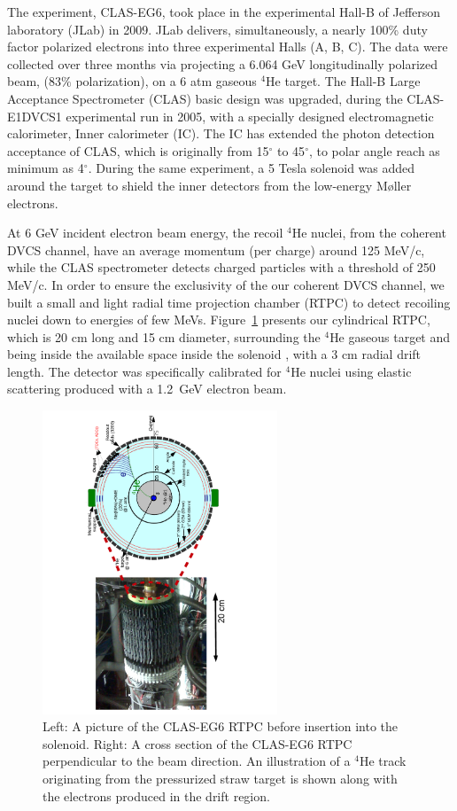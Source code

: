 \documentclass[nofootinbib,twocolumn,showpacs,prl,superscriptaddress,secnumarabic,amssymb,nobibnotes,aps,floatfix]{revtex4}
\begin{document}

The experiment, CLAS-EG6, took place in the experimental Hall-B of Jefferson 
laboratory (JLab) in 2009. JLab delivers, simultaneously, a nearly 100\% duty 
factor polarized electrons into three experimental Halls (A, B, C). The data 
were collected over three months via projecting a 6.064 GeV longitudinally 
polarized beam, (83$\%$ polarization), on a 6 atm gaseous $^4$He target.  The 
Hall-B Large Acceptance Spectrometer (CLAS) basic design \cite{CLAS_ref} was 
upgraded, during the CLAS-E1DVCS1 experimental run \cite{Girod:2007aa} in 2005, 
with a specially designed electromagnetic calorimeter, Inner calorimeter (IC).  
The IC has extended the photon detection acceptance of CLAS, which is 
originally from 15$^{\circ}$ to 45$^{\circ}$, to polar angle reach as minimum 
as 4$^{\circ}$. During the same experiment, a 5 Tesla solenoid was added around 
the target to shield the inner detectors from the low-energy M\o ller 
electrons.

At 6 GeV incident electron beam energy, the recoil $^4$He nuclei, from the 
coherent DVCS channel, have an average momentum (per charge) around 125 MeV/c, 
while the CLAS spectrometer detects charged particles with a threshold of 250 
MeV/c. In order to ensure the exclusivity of the our coherent DVCS channel, we 
built a small and light radial time projection chamber (RTPC) to detect 
recoiling nuclei down to energies of few MeVs. Figure~\ref{fig:RTPC} presents 
our cylindrical RTPC, which is 20 cm long and 15 cm diameter, surrounding the 
$^4$He gaseous target and being inside the available space inside the solenoid 
, with a 3 cm radial drift length. The detector was specifically calibrated for 
$^4$He nuclei using elastic scattering produced with a 1.2~GeV electron beam.


\begin{figure}[tb]
\includegraphics[width=7.0cm,angle=-90]{figs/RTPC.pdf}
\vspace{-0.9cm}
\caption{Left: A picture of the CLAS-EG6 RTPC before insertion into the 
   solenoid. Right: A cross section of the CLAS-EG6 RTPC perpendicular to the 
beam direction. An illustration of a $^4$He track originating from the 
pressurized straw target is shown along with the electrons produced in the 
drift region.}
\label{fig:RTPC}
\end{figure}
\end{document}

